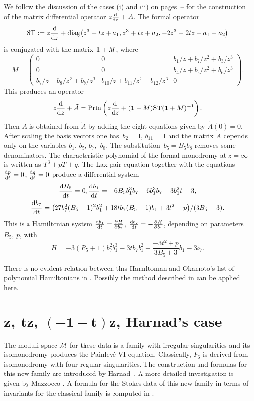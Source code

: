 \documentclass[10pt,a4paper]{amsart}
\numberwithin{equation}{section}
\begin{document}
We follow the discussion of the cases (i) and (ii) on pages~\pageref{(i)}--\pageref{(ii)} for the construction of the matrix differential operator $z\frac{{\rm d}}{{\rm d}z}+A$.
The formal operator
\[
{\rm ST}:=z\frac{{\rm d}}{{\rm d}z}+\operatorname{diag}\bigl(z^3+tz+a_1,z^3+tz+a_2,-2z^3-2tz-a_1-a_2\bigr)
\]
 is conjugated with
the matrix ${\bf 1}+M$, where
\[ M=\begin{pmatrix} 0&0 & b_1/z + b_2/z^2 + b_3/z^3\\
0 &0 & b_4/z + b_5/z^2 + b_6/z^3 \\
b_7/z + b_8/z^2 + b_9/z^3 &b_{10}/z + b_{11}/z^2 + b_{12}/z^3 &0 \end{pmatrix}.\]
This produces an operator
\[
z\frac{{\rm d}}{{\rm d}z}+\tilde{A} = \operatorname{Prin}\left( z\frac{{\rm d}}{{\rm d}z}+( {\bf 1}+M){\rm ST}({\bf 1}+M)^{-1}\right).
\]
Then $A$ is obtained from $\tilde{A}$
by adding the eight equations given by $\tilde{A}(0)=0$. After scaling the basis vectors one has~${b_2=1}$, $b_{11}=1$ and the matrix
$A$ depends only on the variables $b_1$, $b_5$, $b_7$,~$b_8$. The substitution~${b_5=B_5b_8}$ removes some denominators.
The characteristic polynomial of the formal monodromy at $z=\infty$ is written as $T^3+pT+q$.
The Lax pair equation
together with the equations $\frac{{\rm d}p}{{\rm d}t}=0$, $\frac{{\rm d}q}{{\rm d}t}=0$ produce a differential system
\begin{gather*} \frac{{\rm d}B_5}{{\rm d}t}=0, \frac{{\rm d}b_1}{{\rm d}t}= -6B_5b_1^3b_7 - 6b_1^3b_7 - 3b_1^2t - 3, \\
\frac{{\rm d}b_7}{{\rm d}t}=\bigl(27b_7^2(B_5 + 1)^2b_1^2 + 18tb_7(B_5 + 1)b_1 + 3t^2 - p\bigr)/(3B_5 + 3) .\end{gather*}
This is a Hamiltonian system
$\frac{{\rm d}b_1}{{\rm d}t}=\frac{\partial H}{\partial b_7}$, $\frac{{\rm d}b_7}{{\rm d}t}=-\frac{\partial H}{\partial b_1}$,
depending on parameters $B_5$, $p$, with
\[
H=-3(B_5 +1)b_7^2b_1^3 - 3tb_7b_1^2 + \frac{-3t^2 + p}{3B_5 + 3} b_1 - 3b_7.
\]

There is no evident relation between this Hamiltonian and Okamoto's list of polynomial
Hamiltonians in \cite{O1}. Possibly the method described in \cite{D-F-L-S} can be applied here.

 \section[z, tz, (-1-t)z, J.~Harnad's case ]{$\boldsymbol{z}$, $\boldsymbol{tz}$, $\boldsymbol{(-1-t)z}$, Harnad's case}\label{seven}
The moduli space $\mathcal{M}$ for these data is a family with irregular singularities and its isomonodromy produces
the Painlev\'e VI equation. Classically, $P_6$ is derived from isomonodromy with four regular singularities.
The construction and formulas for this new family are introduced by Harnad~\cite{H}. A more detailed investigation
 is given by Mazzocco \cite{Maz}. A formula for the Stokes data of this new family in terms of
 invariants for the classical family is computed in \cite{D-G}.
\end{document}
